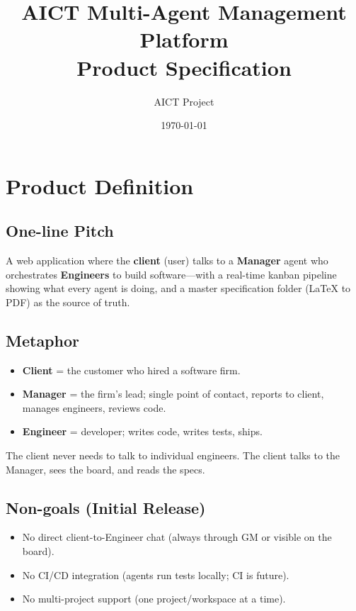 \documentclass[11pt,a4paper]{article}
\title{\textbf{AICT Multi-Agent Management Platform} \\ \Large Product Specification}
\author{AICT Project}
\date{\today}
\begin{document}
\maketitle
\tableofcontents
\newpage

\section{Product Definition}

\subsection{One-line Pitch}

A web application where the \textbf{client} (user) talks to a \textbf{Manager} agent who orchestrates \textbf{Engineers} to build software---with a real-time kanban pipeline showing what every agent is doing, and a master specification folder (LaTeX to PDF) as the source of truth.

\subsection{Metaphor}

\begin{itemize}
  \item \textbf{Client} = the customer who hired a software firm.
  \item \textbf{Manager} = the firm's lead; single point of contact, reports to client, manages engineers, reviews code.
  \item \textbf{Engineer} = developer; writes code, writes tests, ships.
\end{itemize}

The client never needs to talk to individual engineers. The client talks to the Manager, sees the board, and reads the specs.

\subsection{Non-goals (Initial Release)}

\begin{itemize}
  \item No direct client-to-Engineer chat (always through GM or visible on the board).
  \item No CI/CD integration (agents run tests locally; CI is future).
  \item No multi-project support (one project/workspace at a time).
\end{itemize}
\end{document}
